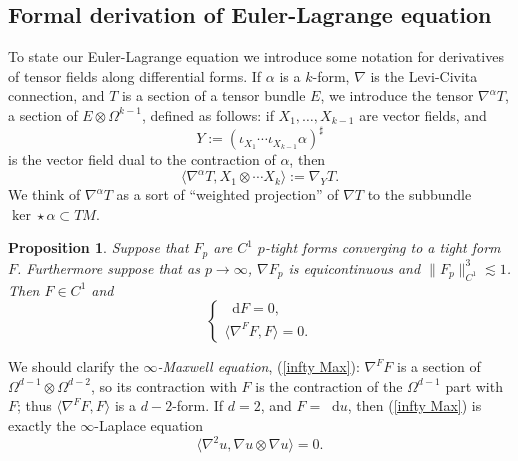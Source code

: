 \documentclass[reqno,11pt]{amsart}
\newcommand*\dif{\mathop{}\!\mathrm{d}}
\newcommand{\dfn}[1]{\emph{#1}\index{#1}}
\newtheorem{proposition}[theorem]{Proposition}
\theoremstyle{definition}
\numberwithin{equation}{section}
\begin{document}
\subsection{Formal derivation of Euler-Lagrange equation}
To state our Euler-Lagrange equation we introduce some notation for derivatives of tensor fields along differential forms.
If $\alpha$ is a $k$-form, $\nabla$ is the Levi-Civita connection, and $T$ is a section of a tensor bundle $E$, we introduce the tensor $\nabla^\alpha T$, a section of $E \otimes \Omega^{k - 1}$, defined as follows: if $X_1, \dots, X_{k - 1}$ are vector fields, and
$$Y := (\iota_{X_1} \cdots \iota_{X_{k - 1}} \alpha)^\sharp$$
is the vector field dual to the contraction of $\alpha$, then
$$\langle \nabla^\alpha T, X_1 \otimes \cdots X_k\rangle := \nabla_Y T.$$
We think of $\nabla^\alpha T$ as a sort of ``weighted projection'' of $\nabla T$ to the subbundle $\ker \star \alpha \subset TM$.

\begin{proposition}
Suppose that $F_p$ are $C^1$ $p$-tight forms converging to a tight form $F$.
Furthermore suppose that as $p \to \infty$, $\nabla F_p$ is equicontinuous and $\|F_p\|_{C^1}^3 \lesssim 1$.
Then $F \in C^1$ and 
\begin{equation}\label{infty Max}
\begin{cases}
\dif F = 0, \\
\langle \nabla^F F, F\rangle = 0.
\end{cases}
\end{equation}
\end{proposition}

We should clarify the \dfn{$\infty$-Maxwell equation}, (\ref{infty Max}): $\nabla^F F$ is a section of $\Omega^{d - 1} \otimes \Omega^{d - 2}$, so its contraction with $F$ is the contraction of the $\Omega^{d - 1}$ part with $F$; thus $\langle \nabla^F F, F\rangle$ is a $d - 2$-form.
If $d = 2$, and $F = \dif u$, then (\ref{infty Max}) is exactly the $\infty$-Laplace equation 
$$\langle\nabla^2 u, \nabla u \otimes \nabla u\rangle = 0.$$
\end{document}
